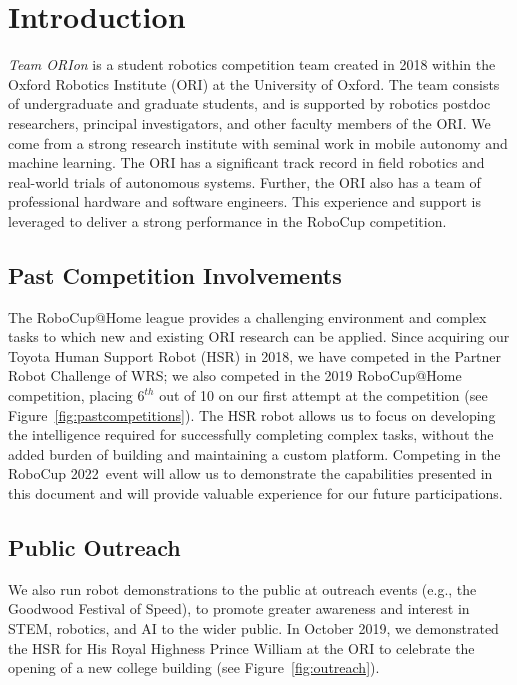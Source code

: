 \documentclass[runningheads,a4paper]{llncs}
\newcommand{\teamori}{Team ORIon}
\newcommand{\competitionyear}{2022}
\newcommand{\robocuptitleshort}{RoboCup \competitionyear}
\begin{document}
\section{Introduction}

\textit{\teamori{}} is a student robotics competition team created in 2018 within the Oxford Robotics Institute (ORI) at the University of Oxford. 
The team consists of undergraduate and graduate students, and is supported by robotics postdoc researchers, principal investigators, and other faculty members of the ORI. 
We come from a strong research institute with seminal work in mobile autonomy and machine learning. The ORI has a significant track record in field robotics and real-world trials of autonomous systems.
Further, the ORI also has a team of professional hardware and software engineers. This experience and support is leveraged to deliver a strong performance in the RoboCup competition.

\subsection{Past Competition Involvements}
The RoboCup@Home league provides a challenging environment and complex tasks to which new and existing ORI research can be applied.
Since acquiring our Toyota Human Support Robot (HSR) in 2018, we have competed in the Partner Robot Challenge of WRS; we also competed in the 2019 RoboCup@Home competition, placing $6^{th}$ out of 10 on our first attempt at the competition (see Figure~\ref{fig:pastcompetitions}). 
The HSR robot allows us to focus on developing the intelligence required for successfully completing complex tasks, without the added burden of building and maintaining a custom platform.
Competing in the \robocuptitleshort\ event will allow us to demonstrate the capabilities presented in this document and will provide valuable experience for our future participations.

\subsection{Public Outreach}
We also run robot demonstrations to the public at outreach events (e.g., the Goodwood Festival of Speed), to promote greater awareness and interest in STEM, robotics, and AI to the wider public. In October 2019, we demonstrated the HSR for His Royal Highness Prince William at the ORI to celebrate the opening of a new college building (see Figure~\ref{fig:outreach}).
\end{document}
